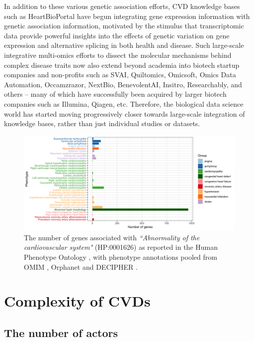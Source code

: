 \documentclass[letter]{bioinfo}
\begin{document}
	In addition to these various genetic association efforts, CVD knowledge bases such as HeartBioPortal \citep{Khomtchouk:2018:HeartBioPortal} have begun integrating gene expression information with genetic association information, motivated by the stimulus that transcriptomic data provide powerful insights into the effects of genetic variation on gene expression and alternative splicing in both health and disease.  Such large-scale integrative multi-omics efforts to dissect the molecular mechanisms behind complex disease traits now also extend beyond academia into biotech startup companies and non-profits such as SVAI, Quiltomics, Omicsoft, Omics Data Automation, Occamzrazor, NextBio, BenevolentAI, Insitro, Researchably, and others -- many of which have successfully been acquired by larger biotech companies such as Illumina, Qiagen, etc.  Therefore, the biological data science world has started moving progressively closer towards large-scale integration of knowledge bases, rather than just individual studies or datasets.    


		\begin{figure}[!tpb]
		\includegraphics[width=1.\linewidth]{hpo-gene-count}
		\caption{The number of genes associated with \emph{``Abnormality of the cardiovascular system"} (HP:0001626) as reported in the Human Phenotype Ontology \citep{Kohler:2014:Human},
			 with phenotype annotations pooled from OMIM \citep{McKusick:2018:OMIM} , Orphanet \citep{INSERM:1997:Orphanet}  and DECIPHER \citep{Firth:2009:DECIPHER}.}
		\label{fig:hpo_gene_count}	
	\end{figure}
	
	
	
	
	\section*{Complexity of CVDs}  %
	\subsection*{The number of actors}
	
\end{document}

